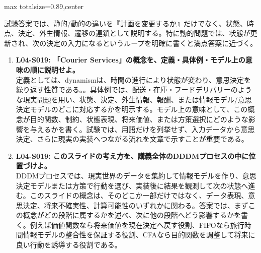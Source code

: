 \begin{minipage}[t]{0.58\textwidth}
\begin{adjustbox}{max totalsize={\textwidth}{0.89\textheight},center}
\begin{minipage}{\textwidth}
試験答案では、静的/動的の違いを『計画を変更するか』だけでなく、状態、時点、決定、外生情報、遷移の連鎖として説明する。特に動的問題では、状態が更新され、次の決定の入力になるというループを明確に書くと満点答案に近づく。\par{}\begin{enumerate}\item \textbf{L04-S019: 「Courier Services」の概念を、定義・具体例・モデル上の意味の順に説明せよ。}\\定義としては、dynamismは、時間の進行により状態が変わり、意思決定を繰り返す性質である。。具体例では、配送・在庫・フードデリバリーのような現実問題を用い、状態、決定、外生情報、報酬、または情報モデル/意思決定モデルのどこに対応するかを明示する。モデル上の意味として、この概念が目的関数、制約、状態表現、将来価値、または方策選択にどのような影響を与えるかを書く。試験では、用語だけを列挙せず、入力データから意思決定、さらに現実の実装へつながる流れを文章で示すことが重要である。\item \textbf{L04-S019: このスライドの考え方を、講義全体のDDDMプロセスの中に位置づけよ。}\\DDDMプロセスでは、現実世界のデータを集約して情報モデルを作り、意思決定モデルまたは方策で行動を選び、実装後に結果を観測して次の状態へ進む。このスライドの概念は、そのどこか一部だけではなく、データ表現、意思決定、将来不確実性、計算可能性のいずれかに関わる。答案では、まずこの概念がどの段階に属するかを述べ、次に他の段階へどう影響するかを書く。例えば価値関数なら将来価値を現在決定へ戻す役割、FIFOなら旅行時間情報モデルの整合性を保証する役割、CFAなら目的関数を調整して将来に良い行動を誘導する役割である。\end{enumerate}
\end{minipage}
\end{adjustbox}
\end{minipage}


